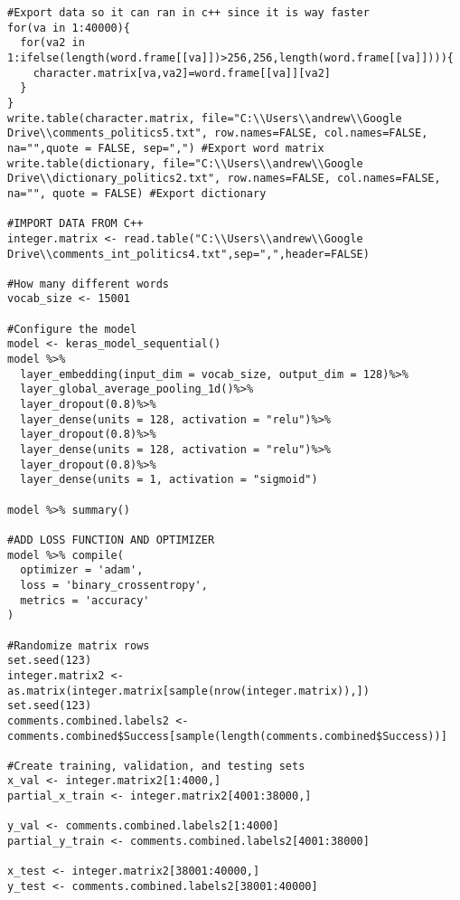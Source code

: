 \begin{lstlisting}
#Export data so it can ran in c++ since it is way faster
for(va in 1:40000){
  for(va2 in 1:ifelse(length(word.frame[[va]])>256,256,length(word.frame[[va]]))){
    character.matrix[va,va2]=word.frame[[va]][va2]
  }
}
write.table(character.matrix, file="C:\\Users\\andrew\\Google Drive\\comments_politics5.txt", row.names=FALSE, col.names=FALSE, na="",quote = FALSE, sep=",") #Export word matrix
write.table(dictionary, file="C:\\Users\\andrew\\Google Drive\\dictionary_politics2.txt", row.names=FALSE, col.names=FALSE, na="", quote = FALSE) #Export dictionary

#IMPORT DATA FROM C++
integer.matrix <- read.table("C:\\Users\\andrew\\Google Drive\\comments_int_politics4.txt",sep=",",header=FALSE)

#How many different words
vocab_size <- 15001

#Configure the model
model <- keras_model_sequential()
model %>% 
  layer_embedding(input_dim = vocab_size, output_dim = 128)%>%
  layer_global_average_pooling_1d()%>%
  layer_dropout(0.8)%>%
  layer_dense(units = 128, activation = "relu")%>%
  layer_dropout(0.8)%>%
  layer_dense(units = 128, activation = "relu")%>%
  layer_dropout(0.8)%>%
  layer_dense(units = 1, activation = "sigmoid")

model %>% summary()

#ADD LOSS FUNCTION AND OPTIMIZER
model %>% compile(
  optimizer = 'adam',
  loss = 'binary_crossentropy',
  metrics = 'accuracy'
)

#Randomize matrix rows
set.seed(123)
integer.matrix2 <- as.matrix(integer.matrix[sample(nrow(integer.matrix)),])
set.seed(123)
comments.combined.labels2 <- comments.combined$Success[sample(length(comments.combined$Success))]

#Create training, validation, and testing sets
x_val <- integer.matrix2[1:4000,]
partial_x_train <- integer.matrix2[4001:38000,]

y_val <- comments.combined.labels2[1:4000]
partial_y_train <- comments.combined.labels2[4001:38000]

x_test <- integer.matrix2[38001:40000,]
y_test <- comments.combined.labels2[38001:40000]



\end{lstlisting}
